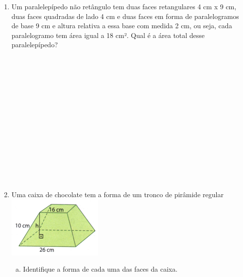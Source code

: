\documentclass[a4paper,14pt]{article}
\begin{document}
	\begin{multicols}{2}
		\begin{enumerate}
	    	\item Um paralelepípedo não retângulo tem duas faces retangulares 4 cm x 9 cm, duas faces quadradas de lado 4 cm e duas faces em forma de paralelogramos de base 9 cm e altura relativa a essa base com medida 2 cm, ou seja, cada paralelogramo tem área igual a 18 cm². Qual é a área total desse paralelepípedo? \\\\\\\\\\\\\\\\\\\\\\\\\\\\\\
	    	\item Uma caixa de chocolate tem a forma de um tronco de pirâmide regular\\
	    	\includegraphics[width=0.9\linewidth]{8FMA30_imagens/aula30-2}
	    	\begin{enumerate}[a)]
	    		\item Identifique a forma de cada uma das faces da caixa.\\\\\\\\\\\\\\\\\\\\\\\\

\end{enumerate}
\end{enumerate}
\end{multicols}
\end{document}
